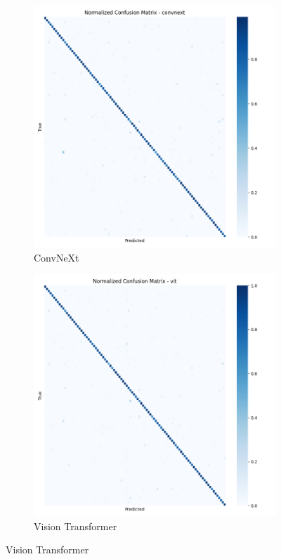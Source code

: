 \documentclass[11pt]{article}
\begin{document}
\begin{figure}[htbp]
\centering
\captionsetup[subfigure]{labelformat=empty}

\begin{subfigure}[b]{0.48\textwidth}
\includegraphics[width=\textwidth]{confusion_matrix_convnext_full.png}
\caption{ConvNeXt}
\end{subfigure}
\hfill
\begin{subfigure}[b]{0.48\textwidth}
\includegraphics[width=\textwidth]{confusion_matrix_vit_full.png}
\caption{Vision Transformer}
\end{subfigure}


\end{figure}
\end{document}

